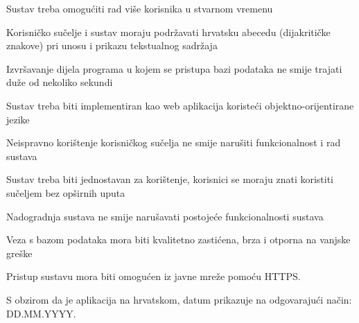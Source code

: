 	 \begin{packed_item}
	 	\item Sustav treba omogućiti rad više korisnika u stvarnom vremenu 
	 	\item  Korisničko sučelje i sustav moraju podržavati hrvatsku abecedu (dijakritičke znakove) pri unosu i prikazu tekstualnog sadržaja
	 	\item  Izvršavanje dijela programa u kojem se pristupa bazi podataka ne smije trajati duže od nekoliko sekundi
	 	\item  Sustav treba biti implementiran kao web aplikacija koristeći objektno-orijentirane jezike
	 	\item  Neispravno korištenje korisničkog sučelja ne smije narušiti funkcionalnost i rad sustava
	 	\item  Sustav treba biti jednostavan za korištenje, korisnici se moraju znati koristiti sučeljem bez opširnih uputa
	 	\item  Nadogradnja sustava ne smije narušavati postojeće funkcionalnosti sustava
	 	\item  Veza s bazom podataka mora biti kvalitetno zastićena, brza i otporna na vanjske greške
	 	\item  Pristup sustavu mora biti omogućen iz javne mreže pomoću HTTPS. 
	 	\item S obzirom da je aplikacija na hrvatskom, datum prikazuje na odgovarajući način: DD.MM.YYYY.
	 \end{packed_item}
	 
